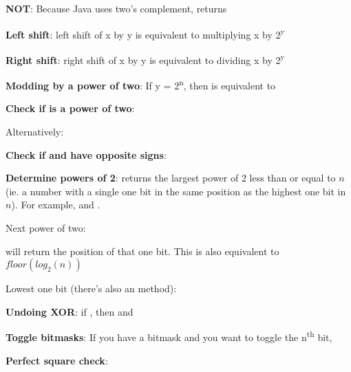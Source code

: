 
\textbf{NOT}: Because Java uses two's complement,  returns 

\textbf{Left shift}: left shift of x by y is equivalent to multiplying x by 2\textsuperscript{y}

\textbf{Right shift}: right shift of x by y is equivalent to dividing x by 2\textsuperscript{y}

\textbf{Modding by a power of two}: If y = 2\textsuperscript{n}, then  is equivalent to 

\textbf{Check if  is a power of two}: 

Alternatively: 

\textbf{Check if  and  have opposite signs}: 

\textbf{Determine powers of 2}:  returns the largest power of 2 less than or equal to $n$ (ie. a number with a single one bit in the same position as the highest one bit in $n$). For example,  and .

Next power of two: 

 will return the position of that one bit. This is also equivalent to $floor(log_2 (n))$

Lowest one bit (there's also an  method): 

\textbf{Undoing XOR}: if , then  and 

\textbf{Toggle bitmasks}: If you have a bitmask and you want to toggle the n\textsuperscript{th} bit, 

\textbf{Perfect square check}:






\newpage